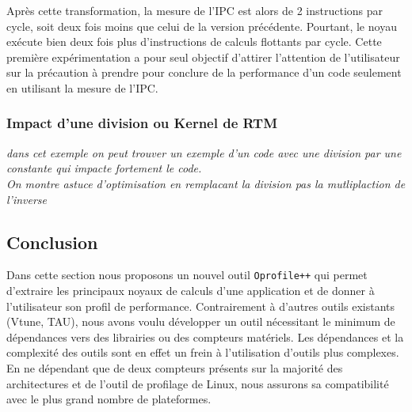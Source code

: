         Après cette transformation, la mesure de l'IPC est alors de 2 instructions par cycle, soit deux fois moins que celui de la version précédente. Pourtant, le noyau exécute bien deux fois plus d'instructions de calculs flottants par cycle. Cette première expérimentation a pour seul objectif d'attirer l'attention de l'utilisateur sur la précaution à prendre pour conclure de la performance d'un code seulement en utilisant la mesure de l'IPC. 
        


    \subsubsection{Impact d'une division ou Kernel de RTM}
    
    \textit{dans cet exemple on peut trouver un exemple d'un code avec une division par une constante qui impacte fortement le code.}\\
    \textit{On montre astuce d'optimisation en remplacant la division pas la mutliplaction de l'inverse}\\
    







\subsection{Conclusion}

    Dans cette section nous proposons un nouvel outil \verb|Oprofile++| qui permet d'extraire les principaux noyaux de calculs d'une application et de donner à l'utilisateur son profil de performance. Contrairement à d'autres outils existants (Vtune, TAU), nous avons voulu développer un outil nécessitant le minimum de dépendances vers des librairies ou des compteurs matériels. Les dépendances et la complexité des outils sont en effet un frein à l'utilisation d'outils plus complexes. En ne dépendant que de deux compteurs présents sur la majorité des architectures et de l'outil de profilage de Linux, nous assurons sa compatibilité avec le plus grand nombre de plateformes. 

